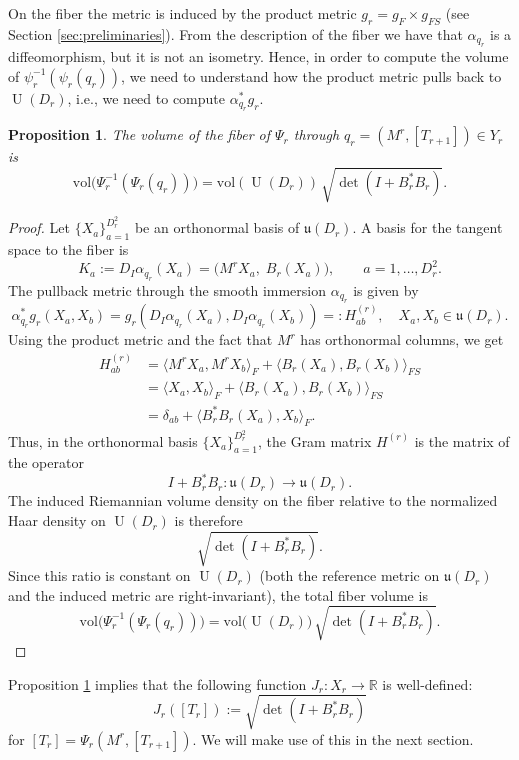 \documentclass{article}
\newtheorem{proposition}[theorem]{Proposition}
\theoremstyle{definition}
\DeclareMathOperator{\U}{U}
\newcommand{\R}{\mathbb{R}}
\newcommand{\vol}{\mathrm{vol}}
\begin{document}
 On the fiber the metric is induced by the product metric $g_r = g_F \times g_{FS}$ (see Section \ref{sec:preliminaries}). From the description of the fiber we have that $\alpha_{q_r}$ is a diffeomorphism, but it is not an isometry. Hence, in order to compute the volume of $\psi_r^{-1}(\psi_r(q_r))$, we need to understand how the product metric pulls back to $\U(D_r)$, i.e., we need to compute $\alpha_{q_r}^*g_r$.
\begin{proposition}\label{prop:fiber_volume_Psi_r}
The volume of the fiber of \(\Psi_r\) through $q_r=(M^r,[T_{r+1}]) \in Y_r$ is
\[
\vol\bigl(\Psi_r^{-1}(\Psi_r(q_r))\bigr)
=
\vol(\U(D_r))\,\sqrt{\det(I+B_r^*B_r)}. 
\]
\end{proposition}

\begin{proof}
Let $\{X_a\}_{a=1}^{D_r^2}$ be an orthonormal basis of \(\mathfrak u(D_r)\). A basis for the tangent space to the fiber is
\[
K_a:=D_I\alpha_{q_r}(X_a)
=
\bigl(M^rX_a,\;B_r(X_a)\bigr) ,
\qquad a=1,\dots,D_r^2.
\]
 The pullback metric through the smooth immersion $\alpha_{q_r}$ is given by
\begin{equation*}
    \alpha_{q_r}^*g_r(X_a, X_b) = g_r(D_I\alpha_{q_r}(X_a), D_I\alpha_{q_r}(X_b)) =: H^{(r)}_{ab}, \quad X_a, X_b \in \mathfrak u(D_r).
\end{equation*}
Using the product metric and the fact that \(M^r\) has orthonormal columns, we get 
\begin{align*}
H^{(r)}_{ab}
&=
\langle M^rX_a,M^rX_b\rangle_{F}
+
\langle B_r(X_a),B_r(X_b)\rangle_{FS} \\
&=
\langle X_a,X_b\rangle_{F}
+
\langle B_r(X_a),B_r(X_b)\rangle_{FS} \\
&=
\delta_{ab}
+
\langle B_r^*B_r(X_a),X_b\rangle_{F}.
\end{align*}
Thus, in the orthonormal basis $\{X_a\}_{a=1}^{D_r^2}$, the Gram matrix \(H^{(r)}\) is the matrix of
the operator
\[
I+B_r^*B_r:\mathfrak u(D_r)\to \mathfrak u(D_r).
\]
The induced Riemannian volume density on the fiber
relative to the normalized Haar density on \(\U(D_r)\) is therefore
\[
\sqrt{\det(I+B_r^*B_r)}.
\]
Since this ratio is constant on \(\U(D_r)\) (both the reference metric on $\mathfrak u(D_r)$ and the induced metric are right-invariant), the total fiber volume
is
\[
\vol\bigl(\Psi_r^{-1}(\Psi_r(q_r))\bigr)
=
\vol\bigl(\U(D_r)\bigr)\,\sqrt{\det(I+B_r^*B_r)}.
\]
\end{proof}
\noindent
Proposition \ref{prop:fiber_volume_Psi_r} implies that the following function $J_r : X_r \rightarrow \R$ is well-defined: 
\begin{equation}\label{eq:J_r_definition}
J_r([T_{r}])
:=
\sqrt{\det(I+B_r^*B_r)}
\end{equation}
for $[T_r] = \Psi_r(M^r, [T_{r+1}])$. We will make use of this in the next section.
\end{document}
